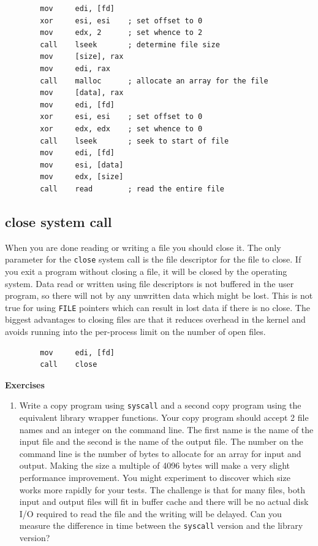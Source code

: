 \documentclass[11pt,b5paper]{book}
\begin{document}
\begin{verbatim}
        mov     edi, [fd]
        xor     esi, esi    ; set offset to 0
        mov     edx, 2      ; set whence to 2
        call    lseek       ; determine file size
        mov     [size], rax
        mov     edi, rax
        call    malloc      ; allocate an array for the file
        mov     [data], rax
        mov     edi, [fd]
        xor     esi, esi    ; set offset to 0
        xor     edx, edx    ; set whence to 0
        call    lseek       ; seek to start of file
        mov     edi, [fd]
        mov     esi, [data]
        mov     edx, [size]
        call    read        ; read the entire file
\end{verbatim}

\subsection{close system call}

When you are done reading or writing a file you should close it. 
The only parameter for the {\tt close} system call is the file descriptor for the file to close.
If you exit a program without closing a file, it will be closed by the operating system.
Data read or written using file descriptors is not buffered in the user program, so there will not
by any unwritten data which might be lost.
This is not true for using {\tt FILE} pointers which can result in lost data if there is no close.
The biggest advantages to closing files are that it reduces overhead in the kernel and avoids running into
the per-process limit on the number of open files.

\begin{verbatim}
        mov     edi, [fd]
        call    close
\end{verbatim}


\vfill
\break
{\bf\large Exercises}

\begin{enumerate}

 \item Write a copy program using {\tt syscall} and a second copy program using the equivalent library
 wrapper functions.
 Your copy program should accept 2 file names and an integer on the command line.
 The first name is the name of the input file and the second is the name of the output file.
 The number on the command line is the number of bytes to allocate for an array for input and output.
 Making the size a multiple of 4096 bytes will make a very slight performance improvement.
 You might experiment to discover which size works more rapidly for your tests.
 The challenge is that for many files, both input and output files will fit in buffer cache and there will
 be no actual disk I/O required to read the file and the writing will be delayed.
 Can you measure the difference in time between the {\tt syscall} version and the library version?
 
\end{enumerate}
\end{document}
